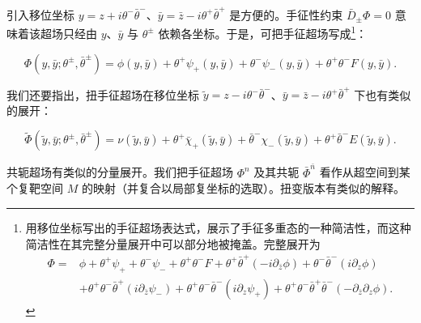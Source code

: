 引入移位坐标 $y=z+i\theta^-\bar\theta^-$、$\bar y=\bar z-i\theta^+\bar\theta^+$ 是方便的。手征性约束 $\bar D_\pm\Phi=0$ 意味着该超场只经由 $y$、$\bar y$ 与 $\theta^\pm$ 依赖各坐标。于是，可把手征超场写成\footnote{用移位坐标写出的手征超场表达式，展示了手征多重态的一种简洁性，而这种简洁性在其完整分量展开中可以部分地被掩盖。完整展开为
\[
\begin{aligned}
\Phi = {} & \phi + \theta^+\psi_+ + \theta^-\psi_- + \theta^+\theta^-F + \theta^+\bar\theta^+(-i\partial_{\bar z}\phi) + \theta^-\bar\theta^-(i\partial_z\phi)\\
& + \theta^+\theta^-\bar\theta^+(i\partial_{\bar z}\psi_-) + \theta^+\theta^-\bar\theta^-(i\partial_z\psi_+) + \theta^+\theta^-\bar\theta^+\bar\theta^-(-\partial_{\bar z}\partial_z\phi).
\end{aligned}
\]
}：

\begin{equation}
\Phi(y,\bar y;\theta^\pm,\bar\theta^\pm) = \phi(y,\bar y) + \theta^+\psi_+(y,\bar y) + \theta^-\psi_-(y,\bar y) + \theta^+\theta^-F(y,\bar y).
\tag{2.15}
\end{equation}

我们还要指出，扭手征超场在移位坐标 $\tilde y=z-i\theta^-\bar\theta^-$、$\bar y=\bar z-i\theta^+\bar\theta^+$ 下也有类似的展开：

\begin{equation}
\tilde\Phi(\tilde y,\bar y;\theta^\pm,\bar\theta^\pm) = \nu(\tilde y,\bar y) + \theta^+\bar\chi_+(\tilde y,\bar y) + \bar\theta^-\chi_-(\tilde y,\bar y) + \theta^+\bar\theta^-E(\tilde y,\bar y).
\tag{2.16}
\end{equation}


共轭超场有类似的分量展开。我们把手征超场 $\Phi^n$ 及其共轭 $\bar\Phi^{\bar n}$ 看作从超空间到某个复靶空间 $M$ 的映射（并复合以局部复坐标的选取）。扭变版本有类似的解释。

